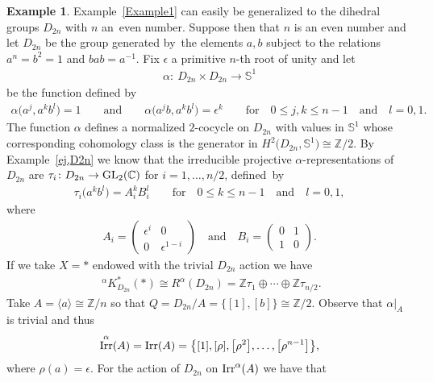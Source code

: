 \documentclass[10pt,a4paper]{amsart}
\def\Z{\mathbb{Z}}
\def\S{\mathbb{S}}
\def\C{\mathbb{C}}
\DeclareMathOperator{\Irr}{\textup{Irr}}
\theoremstyle{definition}
\newtheorem{Ex}[Th]{Example}
\numberwithin{equation}{section}
\begin{document}
\begin{Ex} Example~\ref{Example1} can easily be generalized to the dihedral groups $D_{2n}$
with $n$ an~even number. Suppose then that $n$ is an even number and let $D_{2n}$
be the group generated by~the elements $a,b$ subject to the relations $a^{n}=b^{2}=1$
and $bab=a^{-1}$. Fix $\epsilon$ a primitive $n$-th root of unity and let
\begin{gather*}
\alpha\colon\ D_{2n}\times D_{2n}\rightarrow \S^{1}
\end{gather*}
be the function defined by
\begin{gather*}
\alpha\big(a^{j},a^{k}b^{l}\big)=1 \qquad \text{and} \qquad \alpha\big(a^{j}b,a^{k}b^{l}\big)
=\epsilon^{k}\qquad \text{for}\quad 0\leq j,k\leq n-1 \quad \text{and}\quad l=0,1.
\end{gather*}
The function $\alpha$ defines a normalized $2$-cocycle on $D_{2n}$ with values in $\S^{1}$ whose
corresponding cohomology class is the generator in $H^{2}\big(D_{2n},\S^{1}\big)\cong \Z/2$.
By Example~\ref{ej,D2n} we know that the irreducible projective $\alpha$-representations of
$D_{2n}$ are $\tau_{i}\colon D_{2n}\rightarrow {\rm GL}_{2}(\C)$ for $i=1,\dots, n/2$, defined~by
\begin{gather*}
\tau_{i}\big(a^{k}b^{l}\big)=A_{i}^{k}B_{i}^{l} \qquad\text{for} \quad 0\leq k\leq n-1 \quad \text{and}\quad l=0,1,
\end{gather*}
where
\begin{gather*}
A_{i}=
\begin{pmatrix}
\epsilon^{i} & 0\\
0 & \epsilon^{1-i}
\end{pmatrix}
\quad \text{and}\quad
B_{i}=
\begin{pmatrix}
0 & 1\\
1 & 0
\end{pmatrix}\!.
\end{gather*}
If we take $X=\ast$ endowed with the trivial $D_{2n}$ action we have
\begin{gather*}
\phantom{i}^{\alpha}K^{\ast}_{D_{2n}}(\ast)\cong R^{\alpha}(D_{2n})
=\Z\tau_{1}\oplus\cdots \oplus \Z\tau_{n/2}.
\end{gather*}
Take $A=\langle a\rangle \cong\Z/n$ so that $Q=D_{2n}/A=\{[1],[b]\}\cong \Z/2$.
Observe that $\alpha|_{A}$ is trivial and thus
\begin{gather*}
\Irr^{\alpha}(A)=\Irr(A)=\big\{[1],[\rho],\big[\rho^{2}\big],\dots, \big[\rho^{n-1}\big]\big\},
\end{gather*}
where $\rho(a)=\epsilon$. For the action of $D_{2n}$ on $\Irr^{\alpha}(A)$ we have that

\end{Ex}
\end{document}
